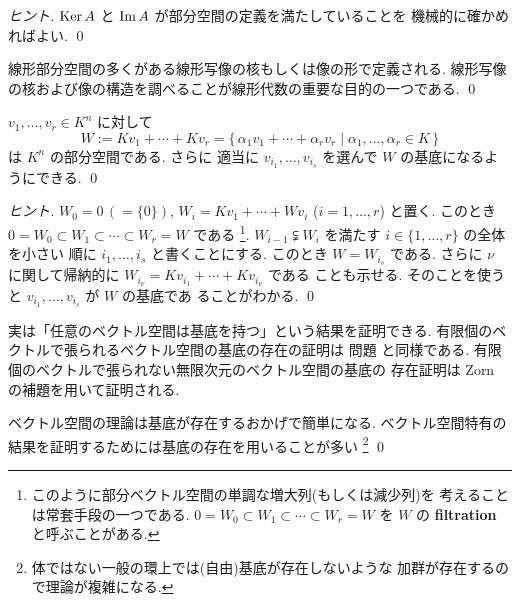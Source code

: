 \documentclass[12pt,twoside]{jarticle}
\begin{document}
\begin{proof}[ヒント]
  $\mathop{\mathrm{Ker}}\nolimits A$ と $\mathop{\mathrm{Im}}\nolimits A$ が部分空間の定義を満たしていることを
  機械的に確かめればよい. \qed
\end{proof}

\begin{guide}
  線形部分空間の多くがある線形写像の核もしくは像の形で定義される. 
  線形写像の核および像の構造を調べることが線形代数の重要な目的の一つである.
  \qed
\end{guide}


\begin{question}
  \label{q:v_i-basis}
  $v_1,\ldots,v_r\in K^n$ に対して
  \begin{equation*}
    W := Kv_1+\cdots+Kv_r
      = \{\, \alpha_1v_1+\cdots+\alpha_rv_r
        \mid \alpha_1,\ldots,\alpha_r\in K \,\}
  \end{equation*}
  は $K^n$ の部分空間である. さらに
  適当に $v_{i_1},\ldots,v_{i_s}$ を選んで $W$ の基底になるようにできる.
  \qed
\end{question}

\begin{proof}[ヒント]
  $W_0 = 0 \,(=\{0\})$, $W_i = Kv_1+\cdots+Wv_i$ ($i=1,\ldots,r$) と置く. 
  このとき $0=W_0\subset W_1\subset\cdots\subset W_r=W$ である%
  \footnote{このように部分ベクトル空間の単調な増大列(もしくは減少列)を
    考えることは常套手段の一つである. 
    $0=W_0\subset W_1\subset\cdots\subset W_r=W$ 
    を $W$ の {\bf filtration} と呼ぶことがある.}.
  $W_{i-1}\subsetneqq W_i$ を満たす $i\in\{1,\ldots,r\}$ の全体を小さい
  順に $i_1,\ldots,i_s$ と書くことにする. 
  このとき $W=W_{i_s}$ である.
  さらに $\nu$ に関して帰納的に $W_{i_\nu}=Kv_{i_1}+\cdots+Kv_{i_\nu}$ である
  ことも示せる. そのことを使うと $v_{i_1},\ldots,v_{i_s}$ が $W$ の基底であ
  ることがわかる.
  \qed
\end{proof}

\begin{guide}
  実は「任意のベクトル空間は基底を持つ」という結果を証明できる.
  有限個のベクトルで張られるベクトル空間の基底の存在の証明は
  問題  と同様である.
  有限個のベクトルで張られない無限次元のベクトル空間の基底の
  存在証明は Zorn の補題を用いて証明される.

  ベクトル空間の理論は基底が存在するおかげで簡単になる.
  ベクトル空間特有の結果を証明するためには基底の存在を用いることが多い%
  \footnote{体ではない一般の環上では(自由)基底が存在しないような
    加群が存在するので理論が複雑になる.}
  \qed
\end{guide}
\end{document}
